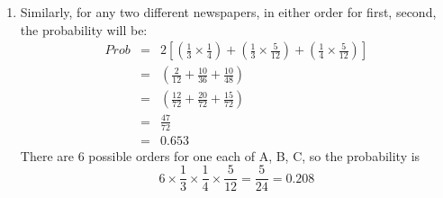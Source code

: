 \documentclass[a4paper,12pt]{article}
\begin{document}
\begin{enumerate}
\item Similarly, for any two different newspapers, in either order for first, second, the probability
will be: 
\begin{eqnarray*}
Prob &=& 2 \left[\left( \frac{1}{3} \times \frac{1}{4} \right) + \left( \frac{1}{3} \times \frac{5}{12} \right) + \left( \frac{1}{4} \times \frac{5}{12} \right)\right]\\
&=& \left( \frac{2}{12} + \frac{10}{36} + \frac{10}{48} \right) \\
&=& \left( \frac{12}{72} + \frac{20}{72} + \frac{15}{72} \right) \\
&=& \frac{47}{72} \\
&=& 0.653
\end{eqnarray*}
There are 6 possible orders for one each of A, B, C, so the probability is \[6\times \frac{1}{3} \times \frac{1}{4}\times  \frac{5}{12}
 = \frac{5}{24} = 0.208 \]
\end{enumerate}
\end{document}
